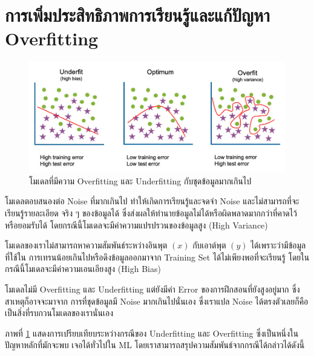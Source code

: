 \section{การเพิ่มประสิทธิภาพการเรียนรู้และแก้ปัญหา Overfitting}
\label{sec:fix_overfit}

\begin{figure}[htbp]
    \centering
    \includegraphics[width=\linewidth]{fig/overfitting.png}
    \caption{โมเดลที่มีความ Overfitting และ Underfitting กับชุดข้อมูลมากเกินไป}
    \label{fig:overfitting}
\end{figure}

\begin{description}[style=nextline]
    \item[Overfitting] โมเดลตอบสนองต่อ Noise ที่มากเกินไป ทำให้เกิดการเรียนรู้และจดจำ Noise และไม่สามารถที่จะเรียนรู้รายละเอียด%
    จริง ๆ ของข้อมูลได้ ซึ่งส่งผลให้ทำนายข้อมูลไม่ได้หรือผิดพลาดมากกว่าที่คาดไว้หรือยอมรับได้ โดยกรณีนี้โมเดลจะมีค่าความแปรปรวนของข้อมูลสูง 
    (High Variance)
    
    \item[Underfitting] โมเดลของเราไม่สามารถหาความสัมพันธ์ระหว่างอินพุต $(x)$ กับเอาต์พุต $(y)$ ได้เพราะว่ามีข้อมูลที่ใช้ใน%
    การเทรนน้อยเกินไปหรือดึงข้อมูลออกมาจาก Training Set ได้ไม่เพียงพอที่จะเรียนรู้ โดยในกรณีนี้โมเดลจะมีค่าความเอนเอียงสูง (High Bias)

    \item[Noisy] โมเดลไม่มี Overfitting และ Underfitting แต่ยังมีค่า Error ของการฝึกสอนที่ยังสูงอยู่มาก ซึ่งสาเหตุก็อาจจะมาจาก%
    การที่ชุดข้อมูลมี Noise มากเกินไปนั่นเอง ซึ่งเราแปล Noise ได้ตรงตัวเลยก็คือเป็นสิ่งที่รบกวนโมเดลของเรานั่นเอง
\end{description}

ภาพที่ \ref{fig:overfitting} แสดงการเปรียบเทียบระหว่างกรณีของ Underfitting และ Overfitting ซึ่งเป็นหนึ่งในปัญหาหลักที่มักจะพบ%
เจอได้ทั่วไปใน ML โดยเราสามารถสรุปความสัมพันธ์จากกรณีได้กล่าวได้ดังนี้

